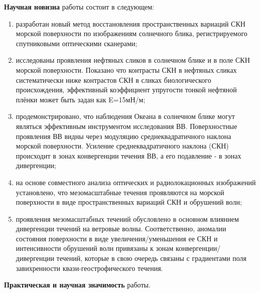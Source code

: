 \textbf{Научная новизна} работы состоит в следующем:

\begin{enumerate}
\item  разработан новый метод восстановления пространственных вариаций СКН морской поверхности по изображениям солнечного блика, регистрируемого спутниковыми оптическими сканерами;

\item  исследованы проявления нефтяных сликов в солнечном блике и в поле СКН морской поверхности. Показано что контрасты СКН в нефтяных сликах систематически ниже контрастов СКН в сликах биологического происхождения, эффективный коэффициент упругости тонкой нефтяной плёнки может быть задан как E=15мН/м;

\item  продемонстрировано, что наблюдения Океана в солнечном блике могут являться эффективным инструментом исследования ВВ. Поверхностные проявления ВВ видны через модуляцию среднеквадратичного наклона морской поверхности. Усиление среднеквадратичного наклона (СКН) происходит в зонах конвергенции течения ВВ, а его подавление - в зонах дивергенции;

\item  на основе совместного анализа оптических и радиолокационных изображений установлено, что мезомасштабные течения проявляются на морской поверхности в виде пространственных вариаций СКН и обрушений волн;

\item  проявления мезомасштабных течений обусловлено в основном влиянием дивергенции течений на ветровые волны. Соответственно, аномалии состояния поверхности в виде увеличения/уменьшения ее СКН и интенсивности обрушений волн привязаны к зонам конвергенции/дивергенции течений, которые в свою очередь связаны с градиентами поля завихренности квази-геострофического течения.
\end{enumerate}

\textbf{Практическая и научная значимость} работы.

